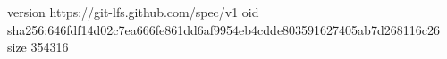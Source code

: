 version https://git-lfs.github.com/spec/v1
oid sha256:646fdf14d02c7ea666fe861dd6af9954eb4cdde803591627405ab7d268116c26
size 354316
